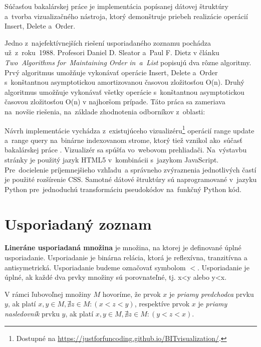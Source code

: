 \documentclass[
  digital,     %
  oneside,     %
  nosansbold,  %
  nocolorbold, %
  lof,         %
  lot,         %
]{fithesis4}
\begin{document}
Súčasťou bakalárskej práce je implementácia popísanej dátovej štruktúry a~tvorba vizualizačného nástroja, ktorý demonštruje priebeh realizácie operácií Insert, Delete a~Order.

Jedno z~najefektívnejších riešení usporiadaného zoznamu pochádza už~z~roku~1988. Profesori Daniel D. Sleator a~Paul F. Dietz v článku \textit{Two~Algorithms for~Maintaining Order in~a~List} \cite{paper3_1988} popisujú dva rôzne algoritmy. Prvý algoritmus umožňuje vykonávať operácie Insert, Delete a~Order s~konštantnou asymptotickou amortizovanou časovou zložitosťou O(n). Druhý algoritmus umožňuje vykonávať všetky operácie s~konštantnou asymptotickou časovou zložitosťou O(n) v najhoršom prípade. Táto práca sa zameriava na~novšie riešenia, na~základe zhodnotenia odborníkov z~oblasti:
 \cite{paper1_ordered_list}

Návrh implementácie vychádza z~existujúceho vizualizéru\footnote{Dostupné na \url{ https://justforfuncoding.github.io/BITvisualization/}.} operácií  range update a~range query na~binárne indexovanom strome, ktorý tiež vznikol ako~súčasť bakalárskej práce \cite{Kridl2022thesis}. Vizualizér sa spúšťa vo~webovom prehliadači. Na~výstavbu stránky je použitý jazyk HTML5 v~kombinácii s~jazykom JavaScript. Pre~docielenie príjemnejšieho vzhľadu~a správneho zvýraznenia jednotlivých častí je použité rozšírenie CSS. Samotné dátové štruktúry sú naprogramované v~jazyku Python pre~jednoduchú transformáciu pseudokódov na~funkčný Python kód.


\chapter{Usporiadaný zoznam}

\textbf{Lineráne usporiadaná množina} je množina, na ktorej je definované úplné usporiadanie. Usporiadanie je binárna relácia, ktorá je reflexívna, tranzitívna a antisymetrická. Usporiadanie budeme označovať symbolom $<$. Usporiadanie je úplné, ak každé dva prvky množiny sú porovnateľné, tj. x<y alebo y<x.

V rámci ľubovoľnej množiny $M$ hovoríme, že prvok $x$ je \emph{priamy predchodca} prvku $y$, ak platí $x, y \in M, \nexists z \in M: (x < z < y)$, respektíve prvok $x$ je \emph{priamy nasledovník} prvku $y$, ak platí $x, y \in M, \nexists z \in M: (y < z < x)$.\\
\end{document}
